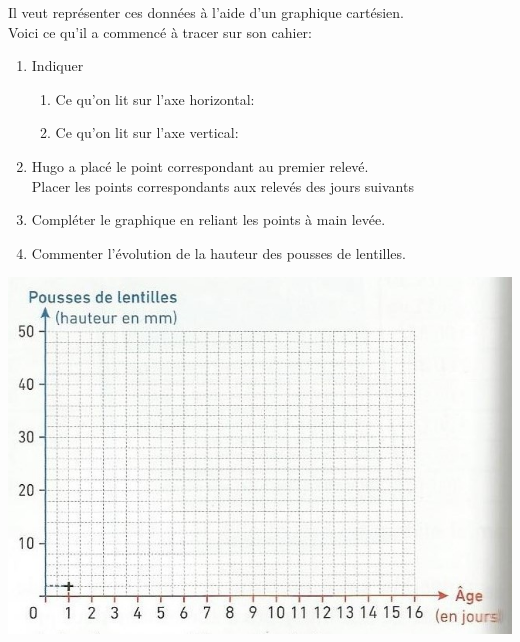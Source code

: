 \documentclass[12pt,a4paper]{article}
\begin{document}
\begin{minipage}{0.5\textwidth}
Il veut représenter ces données à l’aide d’un graphique cartésien.\\
Voici ce qu’il a commencé à tracer sur son cahier:
\begin{enumerate}
\item Indiquer
	\begin{enumerate}
		\item Ce qu’on lit sur l’axe horizontal:\\
		\item Ce qu’on lit sur l’axe vertical:\\
	\end{enumerate}
	\item Hugo a placé le point correspondant au premier relevé.\\
	Placer les points correspondants aux relevés des jours suivants
	\item Compléter le graphique en reliant les points à main levée.
	\item Commenter l’évolution de la hauteur des pousses de lentilles.
\end{enumerate}
\end{minipage}
\begin{minipage}{0.4\textwidth}
\includegraphics[scale=1]{img/act-2.png}
\end{minipage}
\end{document}
